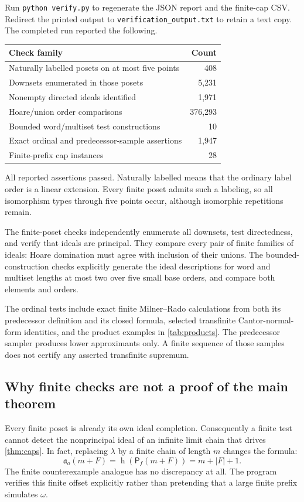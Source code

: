 \documentclass[11pt,letterpaper]{article}
\theoremstyle{teal}
\theoremstyle{definition}
\newcommand{\Pf}{\mathsf P_{\!f}}
\newcommand{\hgt}{\operatorname{h}}
\newcommand{\ao}{\mathfrak a_o}
\begin{document}
Run \texttt{python verify.py} to regenerate the JSON report and the finite-cap CSV. Redirect the printed output to \texttt{verification\_output.txt} to retain a text copy. The completed run reported the following.
\begin{center}
\begin{tabular}{@{}lr@{}}
\toprule
Check family & Count\\
\midrule
Naturally labelled posets on at most five points & 408\\
Downsets enumerated in those posets & 5,231\\
Nonempty directed ideals identified & 1,971\\
Hoare/union order comparisons & 376,293\\
Bounded word/multiset test constructions & 10\\
Exact ordinal and predecessor-sample assertions & 1,947\\
Finite-prefix cap instances & 28\\
\bottomrule
\end{tabular}
\end{center}
All reported assertions passed. Naturally labelled means that the ordinary label order is a linear extension. Every finite poset admits such a labeling, so all isomorphism types through five points occur, although isomorphic repetitions remain.

The finite-poset checks independently enumerate all downsets, test directedness, and verify that ideals are principal. They compare every pair of finite families of ideals: Hoare domination must agree with inclusion of their unions. The bounded-construction checks explicitly generate the ideal descriptions for word and multiset lengths at most two over five small base orders, and compare both elements and orders.

The ordinal tests include exact finite Milner--Rado calculations from both its predecessor definition and its closed formula, selected transfinite Cantor-normal-form identities, and the product examples in \cref{tab:products}. The predecessor sampler produces lower approximants only. A finite sequence of those samples does not certify any asserted transfinite supremum.

\subsection{Why finite checks are not a proof of the main theorem}
Every finite poset is already its own ideal completion. Consequently a finite test cannot detect the nonprincipal ideal of an infinite limit chain that drives \cref{thm:caps}. In fact, replacing $\lambda$ by a finite chain of length $m$ changes the formula:
\[
 \ao(m+F)=\hgt(\Pf(m+F))=m+|F|+1.
\]
The finite counterexample analogue has no discrepancy at all. The program verifies this finite offset explicitly rather than pretending that a large finite prefix simulates $\omega$.
\end{document}
